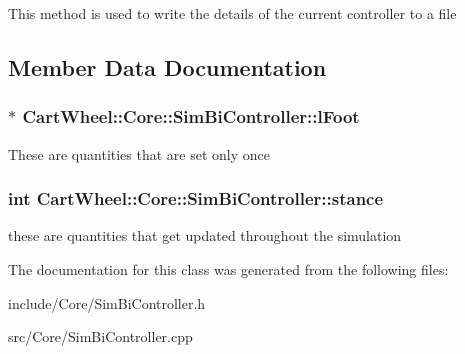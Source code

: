 This method is used to write the details of the current controller to a file 

\subsection{Member Data Documentation}
\hypertarget{classCartWheel_1_1Core_1_1SimBiController_af65dd1e986e1c87aedd55606380df6ee}{
\subsubsection[{lFoot}]{$\ast$ {\bf CartWheel::Core::SimBiController::lFoot}}}
\label{classCartWheel_1_1Core_1_1SimBiController_af65dd1e986e1c87aedd55606380df6ee}
These are quantities that are set only once \hypertarget{classCartWheel_1_1Core_1_1SimBiController_a5f8ee7481e35f496d5a32c412dcecad1}{
\subsubsection[{stance}]{\setlength{\rightskip}{0pt plus 5cm}int {\bf CartWheel::Core::SimBiController::stance}}}
\label{classCartWheel_1_1Core_1_1SimBiController_a5f8ee7481e35f496d5a32c412dcecad1}
these are quantities that get updated throughout the simulation 

The documentation for this class was generated from the following files:\begin{DoxyCompactItemize}
\item 
include/Core/SimBiController.h\item 
src/Core/SimBiController.cpp\end{DoxyCompactItemize}
